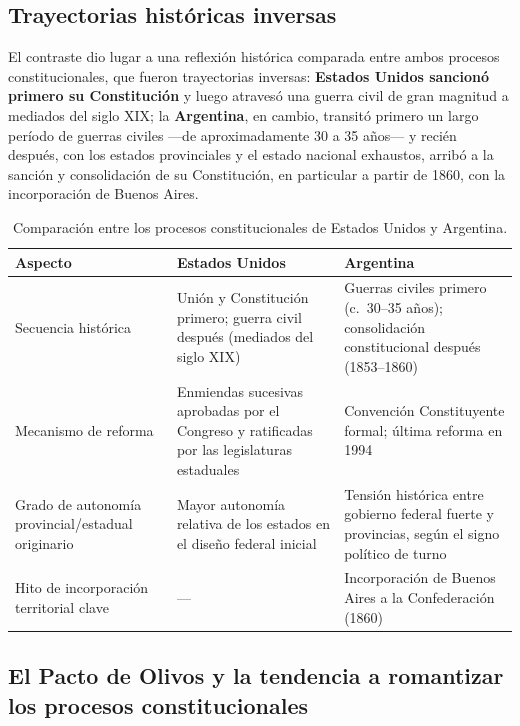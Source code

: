 \documentclass[12pt,oneside]{book}
\begin{document}
\subsection{Trayectorias históricas inversas}

El contraste dio lugar a una reflexión histórica comparada entre ambos procesos constitucionales, que fueron trayectorias inversas: \textbf{Estados Unidos sancionó primero su Constitución} y luego atravesó una guerra civil de gran magnitud a mediados del siglo XIX; la \textbf{Argentina}, en cambio, transitó primero un largo período de guerras civiles ---de aproximadamente 30 a 35 años--- y recién después, con los estados provinciales y el estado nacional exhaustos, arribó a la sanción y consolidación de su Constitución, en particular a partir de 1860, con la incorporación de Buenos Aires.

\begin{table}[H]
\centering
\small
\renewcommand{\arraystretch}{1.25}
\begin{tabularx}{\textwidth}{
    >{\raggedright\arraybackslash}p{}
    >{\raggedright\arraybackslash}X
    >{\raggedright\arraybackslash}X
}
\toprule
\textbf{Aspecto} & \textbf{Estados Unidos} & \textbf{Argentina} \\
\midrule
Secuencia histórica &
Unión y Constitución primero; guerra civil después (mediados del siglo XIX) &
Guerras civiles primero (c.\ 30--35 años); consolidación constitucional después (1853--1860) \\

Mecanismo de reforma &
Enmiendas sucesivas aprobadas por el Congreso y ratificadas por las legislaturas estaduales &
Convención Constituyente formal; última reforma en 1994 \\

Grado de autonomía provincial/estadual originario &
Mayor autonomía relativa de los estados en el diseño federal inicial &
Tensión histórica entre gobierno federal fuerte y provincias, según el signo político de turno \\

Hito de incorporación territorial clave &
--- &
Incorporación de Buenos Aires a la Confederación (1860) \\
\bottomrule
\end{tabularx}
\caption{Comparación entre los procesos constitucionales de Estados Unidos y Argentina.}
\end{table}

\subsection{El Pacto de Olivos y la tendencia a romantizar los procesos constitucionales}
\end{document}
